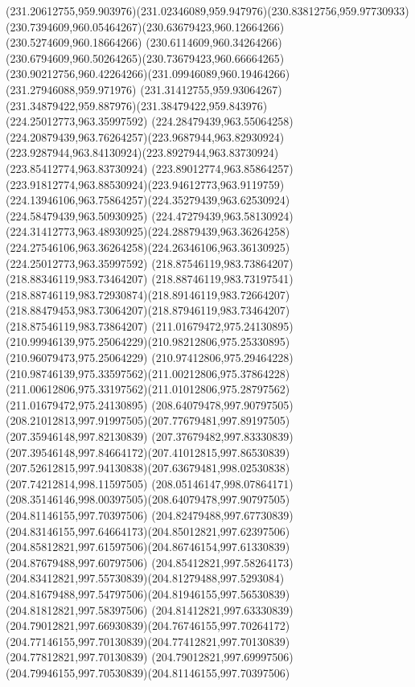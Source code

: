 {{	\curveto(231.20612755,959.903976)(231.02346089,959.947976)(230.83812756,959.97730933)
	\curveto(230.7394609,960.05464267)(230.63679423,960.12664266)(230.5274609,960.18664266)
	\curveto(230.6114609,960.34264266)(230.6794609,960.50264265)(230.73679423,960.66664265)
	\curveto(230.90212756,960.42264266)(231.09946089,960.19464266)(231.27946088,959.971976)
	\curveto(231.31412755,959.93064267)(231.34879422,959.887976)(231.38479422,959.843976)
	\moveto(224.25012773,963.35997592)
	\curveto(224.28479439,963.55064258)(224.20879439,963.76264257)(223.9687944,963.82930924)
	\curveto(223.9287944,963.84130924)(223.8927944,963.83730924)(223.85412774,963.83730924)
	\curveto(223.89012774,963.85864257)(223.91812774,963.88530924)(223.94612773,963.9119759)
	\curveto(224.13946106,963.75864257)(224.35279439,963.62530924)(224.58479439,963.50930925)
	\curveto(224.47279439,963.58130924)(224.31412773,963.48930925)(224.28879439,963.36264258)
	\curveto(224.27546106,963.36264258)(224.26346106,963.36130925)(224.25012773,963.35997592)
	\moveto(218.87546119,983.73864207)
	\lineto(218.88346119,983.73464207)
	\curveto(218.88746119,983.73197541)(218.88746119,983.72930874)(218.89146119,983.72664207)
	\curveto(218.88479453,983.73064207)(218.87946119,983.73464207)(218.87546119,983.73864207)
	\moveto(211.01679472,975.24130895)
	\curveto(210.99946139,975.25064229)(210.98212806,975.25330895)(210.96079473,975.25064229)
	\curveto(210.97412806,975.29464228)(210.98746139,975.33597562)(211.00212806,975.37864228)
	\curveto(211.00612806,975.33197562)(211.01012806,975.28797562)(211.01679472,975.24130895)
	\moveto(208.64079478,997.90797505)
	\curveto(208.21012813,997.91997505)(207.77679481,997.89197505)(207.35946148,997.82130839)
	\curveto(207.37679482,997.83330839)(207.39546148,997.84664172)(207.41012815,997.86530839)
	\curveto(207.52612815,997.94130838)(207.63679481,998.02530838)(207.74212814,998.11597505)
	\curveto(208.05146147,998.07864171)(208.35146146,998.00397505)(208.64079478,997.90797505)
	\moveto(204.81146155,997.70397506)
	\curveto(204.82479488,997.67730839)(204.83146155,997.64664173)(204.85012821,997.62397506)
	\curveto(204.85812821,997.61597506)(204.86746154,997.61330839)(204.87679488,997.60797506)
	\curveto(204.85412821,997.58264173)(204.83412821,997.55730839)(204.81279488,997.5293084)
	\curveto(204.81679488,997.54797506)(204.81946155,997.56530839)(204.81812821,997.58397506)
	\curveto(204.81412821,997.63330839)(204.79012821,997.66930839)(204.76746155,997.70264172)
	\curveto(204.77146155,997.70130839)(204.77412821,997.70130839)(204.77812821,997.70130839)
	\curveto(204.79012821,997.69997506)(204.79946155,997.70530839)(204.81146155,997.70397506)
}}

